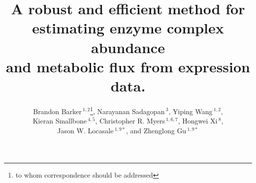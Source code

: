 \documentclass{bioinfo}
\begin{document}

\renewcommand{\figurename}{\textbf{Fig.}}
\captionsetup{belowskip=0pt}









\title[FALCON]{A robust and efficient method for\\ 
estimating enzyme complex abundance\\ 
and metabolic flux from expression data.}
  \author[Barker \textit{et~al.}]{Brandon Barker\,$^{1,2}$\footnote{to whom correspondence should be addressed},
    Narayanan Sadagopan\,$^{3}$, Yiping Wang\,$^{1,2}$, \\
    Kieran Smallbone\,$^{4,5}$, Christopher R. Myers\,$^{1,6,7}$, Hongwei Xi\,$^{8}$, \\ 
    Jason W. Locasale\,$^{1,9*}$, and Zhenglong Gu\,$^{1,9*}$\\
 }

\address{$^{1}$Tri-Institutional Training Program in Computational
  Biology and Medicine, 1300 York Avenue, Box 194, New York, NY, USA.
  $^{2}$Department of Biological Statistics and Computational Biology, 
    Cornell University, 1198 Comstock Hall, Ithaca, NY, USA.
  $^{3}$College of Engineering, Cornell University, Carpenter Hall, 
    Ithaca, NY, USA.
  $^{4}$ School of Computer Science, The University of Manchester, Manchester, UK.
  $^{5}$Manchester Center for Integrative Systems Biology, The University of Manchester, Manchester, UK.
  $^{6}$Laboratory of Atomic and Solid State Physics, Physical Sciences Building,
    Cornell University, Ithaca, NY, USA.
  $^{7}$Life Sciences Core Laboratories Center, Cornell University, 
    Ithaca, NY, USA.
  $^{8}$Department of Computer Science, Boston University,
    111 Cummington Street, Boston, MA, USA.
  $^{9}$Division of Nutritional Sciences, Cornell University, 
    Savage Hall, Ithaca, NY, USA.
  }
\end{document}
